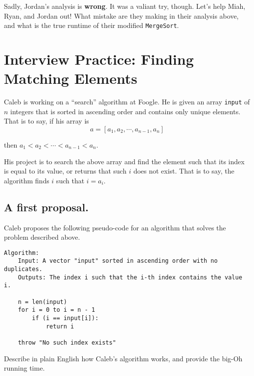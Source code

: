 \documentclass [12pt]{article}
\begin{document}
Sadly, Jordan's analysis is \textbf{wrong}. It was a valiant try, though. Let's help Miah, Ryan, and Jordan out! What mistake are they making in their analysis above, and what is the true runtime of their modified \texttt{MergeSort}.



\pagebreak
\section{Interview Practice: Finding Matching Elements }
Caleb is working on a ``search'' algorithm at Foogle. He is given an array \texttt{input} of $n$ integers that is sorted in ascending order and contains only unique elements. That is to say, if his array is
$$
a = [a_1, a_2, \cdots, a_{n-1}, a_n]
$$

then $a_1 < a_2 < \cdots < a_{n-1} < a_n$. 

His project is to search the above array and find the element such that its index is equal to its value, or returns that such $i$ does not exist. That is to say, the algorithm finds $i$ such that $i = a_i$.

\subsection{A first proposal. }
\label{subsec:first_proposal}
Caleb proposes the following pseudo-code for an algorithm that solves the problem described above.

\begin{verbatim}
Algorithm:
    Input: A vector "input" sorted in ascending order with no duplicates.
    Outputs: The index i such that the i-th index contains the value i.

    n = len(input)
    for i = 0 to i = n - 1
        if (i == input[i]):
            return i

    throw "No such index exists"
\end{verbatim}

Describe in plain English how Caleb's algorithm works, and provide the big-Oh running time.

\end{document}
